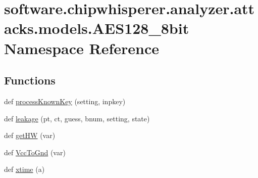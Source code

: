 \hypertarget{namespacesoftware_1_1chipwhisperer_1_1analyzer_1_1attacks_1_1models_1_1AES128__8bit}{}\section{software.\+chipwhisperer.\+analyzer.\+attacks.\+models.\+A\+E\+S128\+\_\+8bit Namespace Reference}
\label{namespacesoftware_1_1chipwhisperer_1_1analyzer_1_1attacks_1_1models_1_1AES128__8bit}
\subsection*{Functions}
\begin{DoxyCompactItemize}
\item 
def \hyperlink{namespacesoftware_1_1chipwhisperer_1_1analyzer_1_1attacks_1_1models_1_1AES128__8bit_a2b764a2591fca27d7d1771b97dd324cd}{process\+Known\+Key} (setting, inpkey)
\item 
def \hyperlink{namespacesoftware_1_1chipwhisperer_1_1analyzer_1_1attacks_1_1models_1_1AES128__8bit_a00d1c3fdc8cf07710dc70de7d751aa28}{leakage} (pt, ct, guess, bnum, setting, state)
\item 
def \hyperlink{namespacesoftware_1_1chipwhisperer_1_1analyzer_1_1attacks_1_1models_1_1AES128__8bit_ad7e775a7bb3510f159149dba221c7732}{get\+H\+W} (var)
\item 
def \hyperlink{namespacesoftware_1_1chipwhisperer_1_1analyzer_1_1attacks_1_1models_1_1AES128__8bit_a61952256c74f62816970ed5226c57b1f}{Vcc\+To\+Gnd} (var)
\item 
def \hyperlink{namespacesoftware_1_1chipwhisperer_1_1analyzer_1_1attacks_1_1models_1_1AES128__8bit_ad37a36500fd9ae3d9248e1146f9f8fa5}{xtime} (a)
\end{DoxyCompactItemize}
